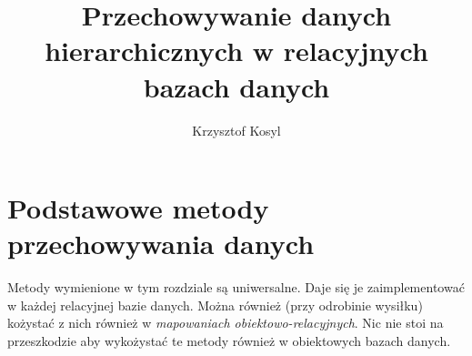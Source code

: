 \documentclass[12pt,a4paper,intlimits,oneside]{report}
\author{Krzysztof Kosyl}
\title{Przechowywanie danych hierarchicznych w relacyjnych bazach danych}
\begin{document}



\tableofcontents{}






\chapter{Podstawowe metody przechowywania danych}

Metody wymienione w tym rozdziale są uniwersalne. Daje się je zaimplementować w każdej relacyjnej bazie danych. 
Można również (przy odrobinie wysiłku) kożystać z nich również w \emph{mapowaniach obiektowo-relacyjnych}.
Nic nie stoi na przeszkodzie aby wykożystać te metody również w obiektowych bazach danych.

	
	
	
	
	
	
	
	
\end{document}
